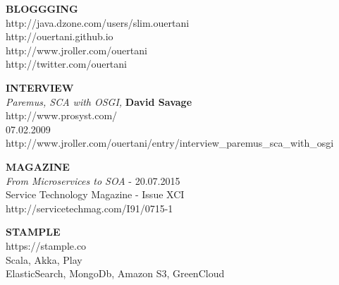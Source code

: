 \documentclass[10pt,a4paper]{article}
\begin{document}
\begin{multicols}{2}
{\bf  BLOGGGING } \\                                   
http://java.dzone.com/users/slim.ouertani  \\          
http://ouertani.github.io      \\                     
http://www.jroller.com/ouertani  \\                    
http://twitter.com/ouertani                         

\columnbreak
{\bf INTERVIEW } \\
{\sl Paremus, SCA with OSGI,} {\bf David Savage}  \\
http://www.prosyst.com/ \\
07.02.2009 \\
http://www.jroller.com/ouertani/entry/interview\_paremus\_sca\_with\_osgi
\end{multicols}


\begin{multicols}{2}
{\bf  MAGAZINE} \\
{\sl From Microservices to SOA} -  20.07.2015 \\
Service Technology Magazine     -  Issue XCI \\
http://servicetechmag.com/I91/0715-1  \\

\columnbreak

{\bf STAMPLE } \\
https://stample.co\\
Scala, Akka, Play \\
ElasticSearch, MongoDb, Amazon S3, GreenCloud
\end{multicols}


\spacedhrule{0em}{-0.4em}

\end{document}
